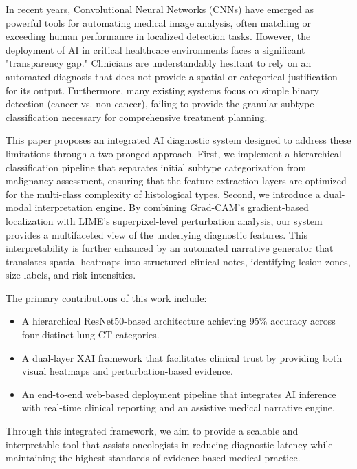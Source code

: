 In recent years, Convolutional Neural Networks (CNNs) have emerged as powerful tools for automating medical image analysis, often matching or exceeding human performance in localized detection tasks. However, the deployment of AI in critical healthcare environments faces a significant "transparency gap." Clinicians are understandably hesitant to rely on an automated diagnosis that does not provide a spatial or categorical justification for its output. Furthermore, many existing systems focus on simple binary detection (cancer vs. non-cancer), failing to provide the granular subtype classification necessary for comprehensive treatment planning.

This paper proposes an integrated AI diagnostic system designed to address these limitations through a two-pronged approach. First, we implement a hierarchical classification pipeline that separates initial subtype categorization from malignancy assessment, ensuring that the feature extraction layers are optimized for the multi-class complexity of histological types. Second, we introduce a dual-modal interpretation engine. By combining Grad-CAM’s gradient-based localization with LIME’s superpixel-level perturbation analysis, our system provides a multifaceted view of the underlying diagnostic features. This interpretability is further enhanced by an automated narrative generator that translates spatial heatmaps into structured clinical notes, identifying lesion zones, size labels, and risk intensities. 

The primary contributions of this work include:
\begin{itemize}
    \item A hierarchical ResNet50-based architecture achieving 95\% accuracy across four distinct lung CT categories.
    \item A dual-layer XAI framework that facilitates clinical trust by providing both visual heatmaps and perturbation-based evidence.
    \item An end-to-end web-based deployment pipeline that integrates AI inference with real-time clinical reporting and an assistive medical narrative engine.
\end{itemize}

Through this integrated framework, we aim to provide a scalable and interpretable tool that assists oncologists in reducing diagnostic latency while maintaining the highest standards of evidence-based medical practice.
